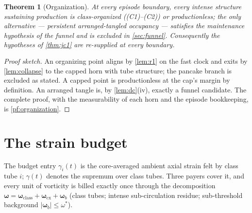\documentclass[11pt,letterpaper]{amsart}
\newtheorem{theorem}{Theorem}[section]
\theoremstyle{definition}
\theoremstyle{remark}
\newcommand{\om}{\omega}
\newcommand{\vort}{\boldsymbol{\omega}}
\newcommand{\abs}[1]{\lvert #1 \rvert}
\begin{document}
\begin{theorem}[Organization]\label{thm:organization}
At every episode boundary, every intense structure sustaining production is
class-organized \textup{((C1)--(C2))} or productionless; the only alternative ---
persistent arranged-tangled occupancy --- satisfies the maintenance hypothesis of the
funnel and is excluded in \cref{sec:funnel}. Consequently the hypotheses of
\cref{thm:jc1} are re-supplied at every boundary.
\end{theorem}

\begin{proof}[Proof sketch]
An organizing point aligns by \cref{lem:r1} on the fast clock and exits by
\cref{lem:collapse} to the capped horn with tube structure; the pancake branch is
excluded as stated. A capped point is productionless at the cap's margin by
definition. An arranged tangle is, by \cref{lem:dc}(iv), exactly a funnel candidate.
The complete proof, with the measurability of each horn and the episode bookkeeping,
is \cref{pf:organization}.
\end{proof}

\section{The strain budget}\label{sec:budget}

The budget entry $\gamma_i(t)$ is the core-averaged ambient axial strain felt by class
tube $i$; $\gamma(t)$ denotes the supremum over class tubes. Three payers cover it,
and every unit of vorticity is billed exactly once through the decomposition
$\vort=\vort_{\mathrm{class}}+\vort_{\mathrm{cx}}+\vort_b$ (class tubes;
intense sub-circulation residue; sub-threshold background $\abs{\vort_b}\le\om^*$).
\end{document}
